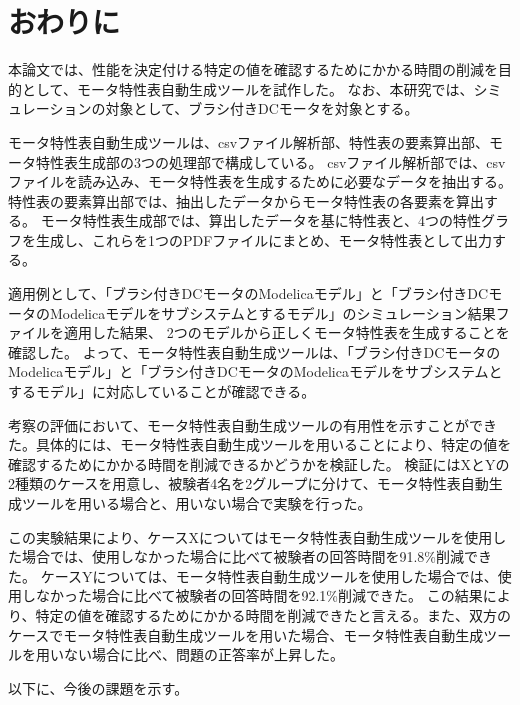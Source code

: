 \chapter{おわりに}\label{cha:Conclusion}
本論文では、性能を決定付ける特定の値を確認するためにかかる時間の削減を目的として、モータ特性表自動生成ツールを試作した。
なお、本研究では、シミュレーションの対象として、ブラシ付きDCモータを対象とする。

モータ特性表自動生成ツールは、csvファイル解析部、特性表の要素算出部、モータ特性表生成部の3つの処理部で構成している。
csvファイル解析部では、csvファイルを読み込み、モータ特性表を生成するために必要なデータを抽出する。特性表の要素算出部では、抽出したデータからモータ特性表の各要素を算出する。
モータ特性表生成部では、算出したデータを基に特性表と、4つの特性グラフを生成し、これらを1つのPDFファイルにまとめ、モータ特性表として出力する。

適用例として、「ブラシ付きDCモータのModelicaモデル」と「ブラシ付きDCモータのModelicaモデルをサブシステムとするモデル」のシミュレーション結果ファイルを適用した結果、
2つのモデルから正しくモータ特性表を生成することを確認した。
よって、モータ特性表自動生成ツールは、「ブラシ付きDCモータのModelicaモデル」と「ブラシ付きDCモータのModelicaモデルをサブシステムとするモデル」に対応していることが確認できる。

考察の評価において、モータ特性表自動生成ツールの有用性を示すことができた。具体的には、モータ特性表自動生成ツールを用いることにより、特定の値を確認するためにかかる時間を削減できるかどうかを検証した。
検証にはXとYの2種類のケースを用意し、被験者4名を2グループに分けて、モータ特性表自動生成ツールを用いる場合と、用いない場合で実験を行った。

この実験結果により、ケースXについてはモータ特性表自動生成ツールを使用した場合では、使用しなかった場合に比べて被験者の回答時間を91.8\%削減できた。
ケースYについては、モータ特性表自動生成ツールを使用した場合では、使用しなかった場合に比べて被験者の回答時間を92.1\%削減できた。
この結果により、特定の値を確認するためにかかる時間を削減できたと言える。また、双方のケースでモータ特性表自動生成ツールを用いた場合、モータ特性表自動生成ツールを用いない場合に比べ、問題の正答率が上昇した。

以下に、今後の課題を示す。




